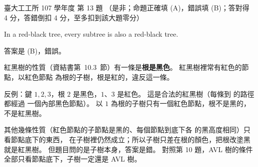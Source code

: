 \begin{pastexam}[label={px:ntu-107-ie-ds-13}]{臺大工工所 107 學年度 第 13 題}
（是非；命題正確填 (A)，錯誤填 (B)；答對得 4 分，答錯倒扣 4 分，至多扣到該大題零分）

In a red-black tree, every subtree is also a red-black tree.
\end{pastexam}

\begin{pastsoln}
答案是 (B)，錯誤。

紅黑樹的性質（資結書第~10.3~節）有一條是\textbf{根是黑色}。 紅黑樹裡常有紅色的節點，以紅色節點
為根的子樹，根是紅的，違反這一條。

反例：鍵 $1, 2, 3$，根 $2$ 是黑色，$1$、$3$ 是紅色。 這是合法的紅黑樹（每條到 \NIL 的路徑都經過
一個內部黑色節點）。 以 $1$ 為根的子樹只有一個紅色節點，根不是黑的，不是紅黑樹。

其他幾條性質（紅色節點的子節點是黑的、每個節點到底下各 \NIL 的黑高度相同）只看節點底下的東西，
在子樹裡仍然成立；所以子樹只差在根的顏色，把根改塗黑就是紅黑樹。 但題目問的是子樹本身，答案是錯。
對照第 10 題，AVL 樹的條件全部只看節點底下，子樹一定還是 AVL 樹。
\end{pastsoln}
